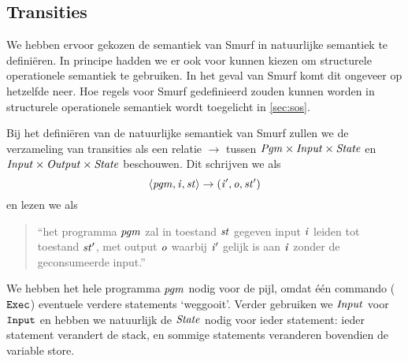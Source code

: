 \subsection{Transities}
\label{sec:def:trans}
We hebben ervoor gekozen de semantiek van Smurf in natuurlijke semantiek te
definiëren. In principe hadden we er ook voor kunnen kiezen om structurele
operationele semantiek te gebruiken. In het geval van Smurf komt dit ongeveer
op hetzelfde neer. Hoe regels voor Smurf gedefinieerd zouden kunnen worden in
structurele operationele semantiek wordt toegelicht in \autoref{sec:sos}.

Bij het definiëren van de natuurlijke semantiek van Smurf zullen we de
verzameling van transities als een relatie $\to$ tussen
$\mathit{Pgm}\times\mathit{Input}\times\mathit{State}$ en $\mathit{Input}\times\mathit{Output}\times\mathit{State}$ beschouwen.
Dit schrijven we als
$$\left\langle\mathit{pgm},\mathit{i},\mathit{st}\right\rangle\to\left(\mathit{i}',\mathit{o},\mathit{st}'\right)$$
en lezen we als
\begin{quote}
	``het programma $\mathit{pgm}$ zal in toestand $\mathit{st}$ gegeven input $\mathit{i}$ leiden tot
	toestand $\mathit{st}'$, met output $\mathit{o}$ waarbij $\mathit{i}'$ gelijk is aan $\mathit{i}$ zonder
	de geconsumeerde input.''
\end{quote}

We hebben het hele programma $\mathit{pgm}$ nodig voor de pijl, omdat één commando
($\texttt{Exec}$) eventuele verdere statements `weggooit'. %
Verder gebruiken we $\mathit{Input}$ voor $\texttt{Input}$ en hebben we natuurlijk de
$\mathit{State}$ nodig voor ieder statement: ieder statement verandert de stack, en
sommige statements veranderen bovendien de variable store.


